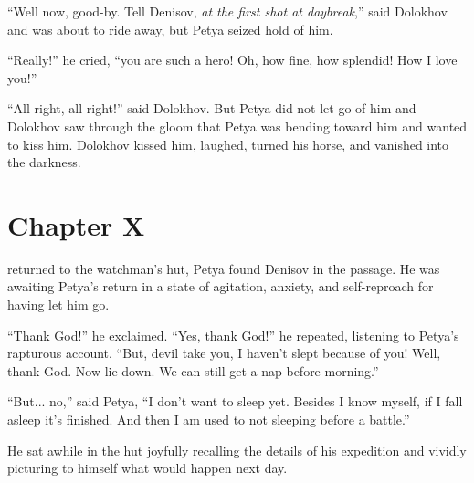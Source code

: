``Well now, good-by. Tell Denisov, \emph{at the first shot at
daybreak},'' said Dolokhov and was about to ride away, but Petya
seized hold of him.

``Really!'' he cried, ``you are such a hero! Oh, how fine, how
splendid!  How I love you!''

``All right, all right!'' said Dolokhov. But Petya did not let go
of him and Dolokhov saw through the gloom that Petya was bending
toward him and wanted to kiss him. Dolokhov kissed him, laughed,
turned his horse, and vanished into the darkness.


\chapter*{Chapter X} \ifaudio {}
\fi

 returned to the watchman's hut, Petya found Denisov in the
passage. He was awaiting Petya's return in a state of agitation,
anxiety, and self-reproach for having let him go.

``Thank God!'' he exclaimed. ``Yes, thank God!'' he repeated,
listening to Petya's rapturous account. ``But, devil take you, I
haven't slept because of you! Well, thank God. Now lie down. We
can still get a nap before morning.''

``But... no,'' said Petya, ``I don't want to sleep yet. Besides I
know myself, if I fall asleep it's finished. And then I am used
to not sleeping before a battle.''

He sat awhile in the hut joyfully recalling the details of his
expedition and vividly picturing to himself what would happen
next day.

